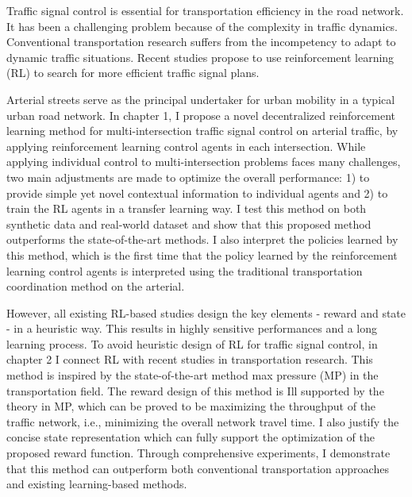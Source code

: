 \begin{englishabstract}
Traffic signal control is essential for transportation efficiency in the road network. It has been a challenging problem because of the complexity in traffic dynamics. Conventional transportation research suffers from the incompetency to adapt to dynamic traffic situations. Recent studies propose to use reinforcement learning (RL) to search for more efficient traffic signal plans. 

Arterial streets serve as the principal undertaker for urban mobility in a typical urban road network. In chapter 1, I propose a novel decentralized reinforcement learning method for multi-intersection traffic signal control on arterial traffic, by applying reinforcement learning control agents in each intersection. While applying individual control to multi-intersection problems faces many challenges, two main adjustments are made to optimize the overall performance: 1) to provide simple yet novel contextual information to individual agents and 2) to train the RL agents in a transfer learning way. I test this method on both synthetic data and real-world dataset and show that this proposed method outperforms the state-of-the-art methods. I also interpret the policies learned by this method, which is the first time that the policy learned by the reinforcement learning control agents is interpreted using the traditional transportation coordination method on the arterial. 

However, all existing RL-based studies design the key elements - reward and state - in a heuristic way. This results in highly sensitive performances and a long learning process. To avoid heuristic design of RL for traffic signal control, in chapter 2 I connect RL with recent studies in transportation research. This method is inspired by the state-of-the-art method max pressure (MP) in the transportation field. The reward design of this method is Ill supported by the theory in MP, which can be proved to be maximizing the throughput of the traffic network, i.e., minimizing the overall network travel time. I also justify the concise state representation which can fully support the optimization of the proposed reward function. Through comprehensive experiments, I demonstrate that this method can outperform both conventional transportation approaches and existing learning-based methods.



\end{englishabstract}
